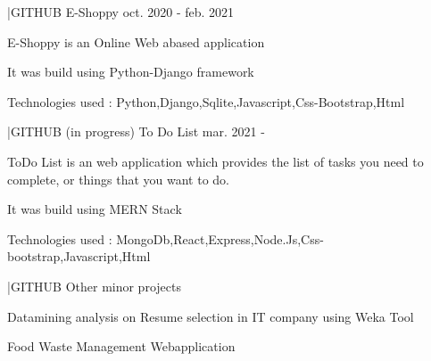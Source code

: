 

\begin{cventries}

  \cventry
  {|GITHUB} %
    {E-Shoppy} %
    {} %
    {oct. 2020 - feb. 2021 } %
    {
      \begin{cvitems} %
        \item { E-Shoppy is an Online Web abased application 
}
        \item {It was build using Python-Django framework}
        \item {Technologies used : Python,Django,Sqlite,Javascript,Css-Bootstrap,Html}
      \end{cvitems}
    }
  \cventry
  {|GITHUB (in progress)} %
    {To Do List} %
    {} %
    {mar. 2021 - } %
    {
      \begin{cvitems} %
        \item { ToDo List is an web application which provides the list of tasks you need to complete, or things that you want to do. 
}
        \item {It was build using MERN Stack}
        \item {Technologies used : MongoDb,React,Express,Node.Js,Css-bootstrap,Javascript,Html}
      \end{cvitems}
    }
\cventry
  {|GITHUB} %
    {Other minor projects} %
    {} %
    {} %
    {
      \begin{cvitems} %
        \item {Datamining analysis on Resume selection in IT company  using Weka Tool
}
        \item {Food Waste Management Webapplication}
      \end{cvitems}
    }
\end{cventries}
